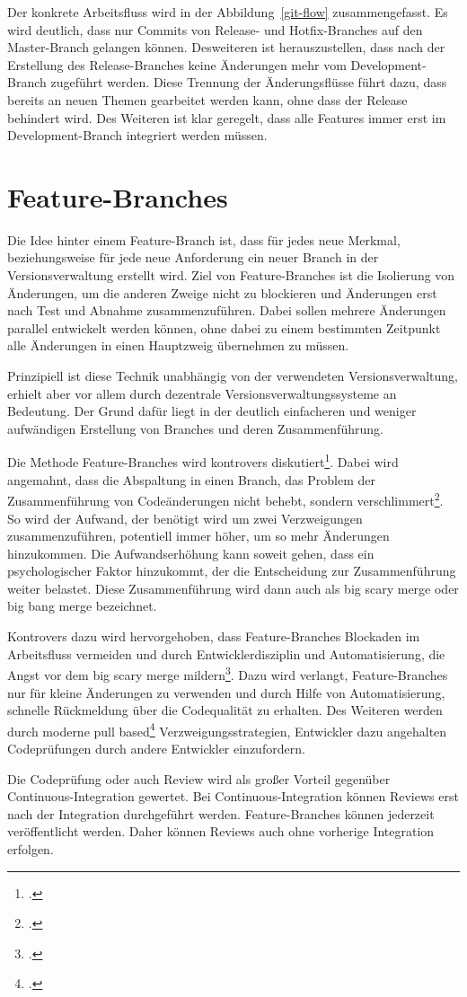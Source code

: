 Der konkrete Arbeitsfluss wird in der Abbildung~\ref{git-flow} zusammengefasst. Es wird deutlich, dass nur Commits von 
Release- und Hotfix-Branches auf den Master-Branch gelangen können. Desweiteren ist herauszustellen, dass nach der 
Erstellung des Release-Branches keine Änderungen mehr vom Development-Branch zugeführt werden. Diese Trennung der 
Änderungsflüsse führt dazu, dass bereits an neuen Themen gearbeitet werden kann, ohne dass der Release behindert wird. 
Des Weiteren ist klar geregelt, dass alle Features immer erst im Development-Branch integriert werden müssen.

\section{Feature-Branches}
\label{sec:feature-branches}
Die Idee hinter einem Feature-Branch ist, dass für jedes neue Merkmal, beziehungsweise für jede neue Anforderung ein neuer Branch in der Versionsverwaltung erstellt wird. Ziel von Feature-Branches ist die Isolierung von Änderungen, um die anderen Zweige nicht zu blockieren und Änderungen erst nach Test und Abnahme zusammenzuführen. Dabei sollen mehrere Änderungen parallel entwickelt werden können, ohne dabei zu einem bestimmten Zeitpunkt alle Änderungen in einen Hauptzweig übernehmen zu müssen.

Prinzipiell ist diese Technik unabhängig von der verwendeten Versionsverwaltung, erhielt aber vor allem durch dezentrale Versionsverwaltungssysteme an Bedeutung. Der Grund dafür liegt in der deutlich einfacheren und weniger aufwändigen Erstellung von Branches und deren Zusammenführung.

Die Methode Feature-Branches wird kontrovers diskutiert\footcite[vgl.][]{fb-revisited}. 
Dabei wird angemahnt, dass die Abspaltung in einen Branch, das Problem der Zusammenführung von Codeänderungen nicht behebt, sondern verschlimmert\footcite[vgl.][]{fowler-feature-branch}. So wird der Aufwand, der benötigt wird um zwei Verzweigungen zusammenzuführen, potentiell immer höher, um so mehr Änderungen hinzukommen. Die Aufwandserhöhung kann soweit gehen, dass ein psychologischer Faktor 
hinzukommt, der die Entscheidung zur Zusammenführung weiter belastet. Diese Zusammenführung wird dann auch als \glqq big scary merge\grqq{} oder \glqq big bang merge\grqq{} bezeichnet.

Kontrovers dazu wird hervorgehoben, dass Feature-Branches Blockaden im Arbeitsfluss vermeiden und durch Entwicklerdisziplin und Automatisierung, die Angst vor dem \glqq big scary merge\grqq{} mildern\footcite[vgl.][]{ci-is-dead}. Dazu wird verlangt, Feature-Branches nur für kleine Änderungen zu verwenden und durch Hilfe von Automatisierung, schnelle Rückmeldung über die Codequalität zu erhalten. Des Weiteren werden durch moderne \glqq pull based\grqq{}\footcite[vgl.][]{github-about-pull} Verzweigungsstrategien, Entwickler dazu angehalten Codeprüfungen durch andere Entwickler einzufordern. 

Die Codeprüfung oder auch Review wird als großer Vorteil gegenüber Continuous-Integration gewertet. Bei Continuous-Integration können Reviews erst nach der Integration durchgeführt werden. Feature-Branches können jederzeit veröffentlicht werden. Daher können Reviews auch ohne vorherige Integration erfolgen. 